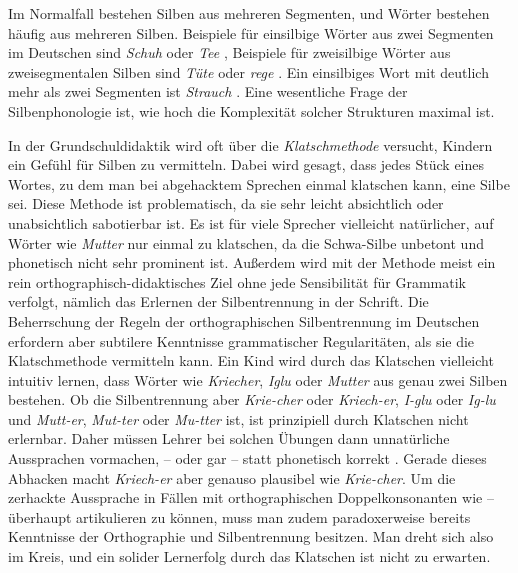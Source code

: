 Im Normalfall bestehen Silben aus mehreren Segmenten, und Wörter bestehen häufig aus mehreren Silben.
Beispiele für einsilbige Wörter aus zwei Segmenten im Deutschen sind \textit{Schuh} \textipa{[Su:]} oder \textit{Tee} \textipa{[te:]}, Beispiele für zweisilbige Wörter aus zweisegmentalen Silben sind \textit{Tüte} \textipa{[ty:t@]} oder \textit{rege} \textipa{[Ke:g@]}.
Ein einsilbiges Wort mit deutlich mehr als zwei Segmenten ist \textit{Strauch} \textipa{[StK\t{aO}X]}. 
Eine wesentliche Frage der Silbenphonologie ist, wie hoch die Komplexität solcher Strukturen maximal ist.


In der Grundschuldidaktik wird oft über die \textit{Klatschmethode} versucht, Kindern ein Gefühl für Silben zu vermitteln.
Dabei wird gesagt, dass jedes Stück eines Wortes, zu dem man bei abgehacktem Sprechen einmal klatschen kann, eine Silbe sei.
Diese Methode ist problematisch, da sie sehr leicht absichtlich oder unabsichtlich sabotierbar ist.
Es ist für viele Sprecher vielleicht natürlicher, auf Wörter wie \textit{Mutter} \textipa{[mUt5]} nur einmal zu klatschen, da die Schwa-Silbe unbetont und phonetisch nicht sehr prominent ist.
Außerdem wird mit der Methode meist ein rein orthographisch-didaktisches Ziel ohne jede Sensibilität für Grammatik verfolgt, nämlich das Erlernen der Silbentrennung in der Schrift.
Die Beherrschung der Regeln der orthographischen Silbentrennung im Deutschen erfordern aber subtilere Kenntnisse grammatischer Regularitäten, als sie die Klatschmethode vermitteln kann.
Ein Kind wird durch das Klatschen vielleicht intuitiv lernen, dass Wörter wie \textit{Kriecher}, \textit{Iglu} oder \textit{Mutter} aus genau zwei Silben bestehen.
Ob die Silbentrennung aber \textit{Krie-cher} oder \textit{Kriech-er}, \textit{I-glu} oder \textit{Ig-lu} und \textit{Mutt-er}, \textit{Mut-ter} oder \textit{Mu-tter} ist, ist prinzipiell durch Klatschen nicht erlernbar.
Daher müssen Lehrer bei solchen Übungen dann unnatürliche Aussprachen vormachen, \zB \textipa{[mUt]} -- \textipa{[ta]} oder gar \textipa{[mUt]} -- \textipa{[tEK]} statt phonetisch korrekt \textipa{[mU.t5]}.
Gerade dieses Abhacken macht \textit{Kriech-er} aber genauso plausibel wie \textit{Krie-cher}.
Um die zerhackte Aussprache in Fällen mit orthographischen Doppelkonsonanten wie \textipa{[mUt]} -- \textipa{[ta]} überhaupt artikulieren zu können, muss man zudem paradoxerweise bereits Kenntnisse der Orthographie und Silbentrennung besitzen.
Man dreht sich also im Kreis, und ein solider Lernerfolg durch das Klatschen ist nicht zu erwarten.

